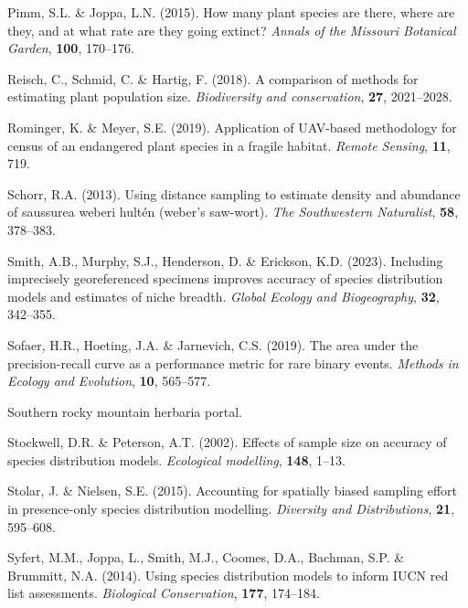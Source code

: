 \documentclass[
]{article}
\newlength{\cslhangindent}
\newenvironment{CSLReferences}[2] %
 {\begin{list}{}{%
  \setlength{\itemindent}{0pt}
  \setlength{\leftmargin}{0pt}
  \setlength{\parsep}{0pt}
  \ifodd #1
   \setlength{\leftmargin}{\cslhangindent}
   \setlength{\itemindent}{-1\cslhangindent}
  \fi
  \setlength{\itemsep}{#2\baselineskip}}}
 {\end{list}}
\begin{document}
\begin{CSLReferences}{1}{1}
Pimm, S.L. \& Joppa, L.N. (2015). How many plant species are there,
where are they, and at what rate are they going extinct? \emph{Annals of
the Missouri Botanical Garden}, \textbf{100}, 170--176.

Reisch, C., Schmid, C. \& Hartig, F. (2018). A comparison of methods for
estimating plant population size. \emph{Biodiversity and conservation},
\textbf{27}, 2021--2028.

Rominger, K. \& Meyer, S.E. (2019). Application of UAV-based methodology
for census of an endangered plant species in a fragile habitat.
\emph{Remote Sensing}, \textbf{11}, 719.

Schorr, R.A. (2013). Using distance sampling to estimate density and
abundance of saussurea weberi hult{é}n (weber's saw-wort). \emph{The
Southwestern Naturalist}, \textbf{58}, 378--383.

Smith, A.B., Murphy, S.J., Henderson, D. \& Erickson, K.D. (2023).
Including imprecisely georeferenced specimens improves accuracy of
species distribution models and estimates of niche breadth. \emph{Global
Ecology and Biogeography}, \textbf{32}, 342--355.

Sofaer, H.R., Hoeting, J.A. \& Jarnevich, C.S. (2019). The area under
the precision-recall curve as a performance metric for rare binary
events. \emph{Methods in Ecology and Evolution}, \textbf{10}, 565--577.

Southern rocky mountain herbaria portal.

Stockwell, D.R. \& Peterson, A.T. (2002). Effects of sample size on
accuracy of species distribution models. \emph{Ecological modelling},
\textbf{148}, 1--13.

Stolar, J. \& Nielsen, S.E. (2015). Accounting for spatially biased
sampling effort in presence-only species distribution modelling.
\emph{Diversity and Distributions}, \textbf{21}, 595--608.

Syfert, M.M., Joppa, L., Smith, M.J., Coomes, D.A., Bachman, S.P. \&
Brummitt, N.A. (2014). Using species distribution models to inform IUCN
red list assessments. \emph{Biological Conservation}, \textbf{177},
174--184.


\end{CSLReferences}
\end{document}
